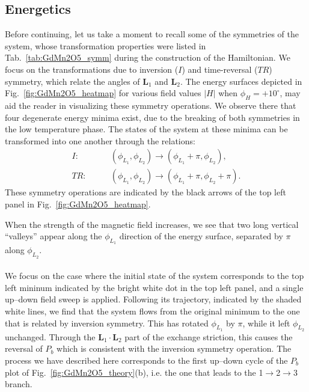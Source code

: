 \subsection{Energetics}
Before continuing, let us take a moment to recall some of the symmetries of the system, whose transformation properties were listed in Tab.~\ref{tab:GdMn2O5_symm} during the construction of the Hamiltonian.
We focus on the transformations due to inversion ($I$) and time-reversal ($TR$) symmetry, which relate the angles of $\bm L_1$ and $\bm L_2$.
The energy surfaces depicted in Fig.~\ref{fig:GdMn2O5_heatmap} for various field values $|H|$ when $\phi_H = +10^\circ$, may aid the reader in visualizing these symmetry operations.
We observe there that four degenerate energy minima exist, due to the breaking of both symmetries in the low temperature phase.
The states of the system at these minima can be transformed into one another through the relations:
\begin{align}
	I:\qquad &(\phi_{L_1}, \phi_{L_2}) \rightarrow (\phi_{L_1}+\pi, \phi_{L_2}),\\
	TR:\qquad &(\phi_{L_1}, \phi_{L_2})\rightarrow(\phi_{L_1}+\pi, \phi_{L_2}+\pi).
\end{align}
These symmetry operations are indicated by the black arrows of the top left panel in Fig.~\ref{fig:GdMn2O5_heatmap}.
\begin{figure*}[h!]
	\centering
	\caption{{\bf $(\phi_{L_1}, \phi_{L_2})$ energy surfaces for $\phi_H =+10^\circ$.} The shaded dots denote the four degenerate minima. The full white dot corresponds to the example situation discussed in the main text. An indication of its trajectory during a double up--down field sweep is given by the shaded lines. The two black arrows denote the time-reversal (TR) and inversion (I) operations.\label{fig:GdMn2O5_heatmap}}
\end{figure*}
When the strength of the magnetic field increases, we see that two long vertical ``valleys'' appear along the $\phi_{L_1}$ direction of the energy surface, separated by $\pi$ along $\phi_{L_2}$.
\\\\
We focus on the case where the initial state of the system corresponds to the top left mininum indicated by the bright white dot in the top left panel, and a single up--down field sweep is applied.
Following its trajectory, indicated by the shaded white lines, we find that the system flows from the original minimum to the one that is related by inversion symmetry.
This has rotated $\phi_{L_1}$ by $\pi$, while it left $\phi_{L_2}$ unchanged.
Through the $\bm L_1 \cdot \bm L_2$ part of the exchange striction, this causes the reversal of $P_b$ which is consistent with the inversion symmetry operation.
The process we have described here corresponds to the first up--down cycle of the $P_b$ plot of Fig.~\ref{fig:GdMn2O5_theory}(b), i.e. the one that leads to the 1$\rightarrow$2$\rightarrow$3 branch.

